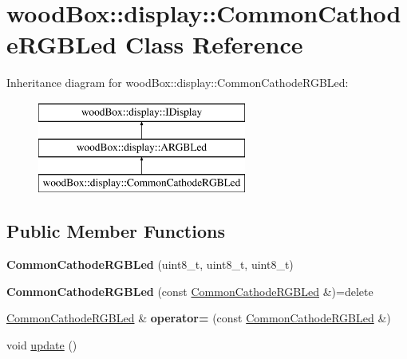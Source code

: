 \hypertarget{classwood_box_1_1display_1_1_common_cathode_r_g_b_led}{}\section{wood\+Box\+:\+:display\+:\+:Common\+Cathode\+R\+G\+B\+Led Class Reference}
\label{classwood_box_1_1display_1_1_common_cathode_r_g_b_led}
Inheritance diagram for wood\+Box\+:\+:display\+:\+:Common\+Cathode\+R\+G\+B\+Led\+:\begin{figure}[H]
\begin{center}
\leavevmode
\includegraphics[height=3.000000cm]{classwood_box_1_1display_1_1_common_cathode_r_g_b_led}
\end{center}
\end{figure}
\subsection*{Public Member Functions}
\begin{DoxyCompactItemize}
\item 
\mbox{\label{classwood_box_1_1display_1_1_common_cathode_r_g_b_led_ae80f49d3de90e4fa71c1a7b1d53c4860}} 
{\bfseries Common\+Cathode\+R\+G\+B\+Led} (uint8\+\_\+t, uint8\+\_\+t, uint8\+\_\+t)
\item 
\mbox{\label{classwood_box_1_1display_1_1_common_cathode_r_g_b_led_ac51ed1f3b287d14ee7cb1bebd52dde9a}} 
{\bfseries Common\+Cathode\+R\+G\+B\+Led} (const \mbox{\hyperlink{classwood_box_1_1display_1_1_common_cathode_r_g_b_led}{Common\+Cathode\+R\+G\+B\+Led}} \&)=delete
\item 
\mbox{\label{classwood_box_1_1display_1_1_common_cathode_r_g_b_led_ac63439ba3808fb22cbcee7fb1c061b03}} 
\mbox{\hyperlink{classwood_box_1_1display_1_1_common_cathode_r_g_b_led}{Common\+Cathode\+R\+G\+B\+Led}} \& {\bfseries operator=} (const \mbox{\hyperlink{classwood_box_1_1display_1_1_common_cathode_r_g_b_led}{Common\+Cathode\+R\+G\+B\+Led}} \&)
\item 
void \mbox{\hyperlink{classwood_box_1_1display_1_1_common_cathode_r_g_b_led_a597c7ae002c7f94431ccaafd160a857a}{update}} ()
\end{DoxyCompactItemize}


